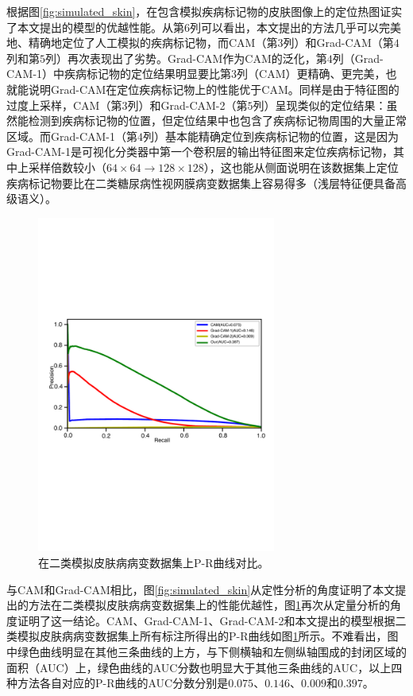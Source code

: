 根据图\ref{fig:simulated_skin}，在包含模拟疾病标记物的皮肤图像上的定位热图证实了本文提出的模型的优越性能。从第$6$列可以看出，本文提出的方法几乎可以完美地、精确地定位了人工模拟的疾病标记物，而CAM（第$3$列）和Grad-CAM（第$4$列和第$5$列）再次表现出了劣势。Grad-CAM作为CAM的泛化，第$4$列（Grad-CAM-1）中疾病标记物的定位结果明显要比第$3$列（CAM）更精确、更完美，也就能说明Grad-CAM在定位疾病标记物上的性能优于CAM。同样是由于特征图的过度上采样，CAM（第$3$列）和Grad-CAM-2（第$5$列）呈现类似的定位结果：虽然能检测到疾病标记物的位置，但定位结果中也包含了疾病标记物周围的大量正常区域。而Grad-CAM-1（第$4$列）基本能精确定位到疾病标记物的位置，这是因为Grad-CAM-1是可视化分类器中第一个卷积层的输出特征图来定位疾病标记物，其中上采样倍数较小（$64\times 64\rightarrow 128\times 128$），这也能从侧面说明在该数据集上定位疾病标记物要比在二类糖尿病性视网膜病变数据集上容易得多（浅层特征便具备高级语义）。
\begin{figure}[h]
	\centering
	\includegraphics[width=0.7\textwidth]{figure/pr_curve_skin_image/pr_curve.pdf}
	\caption[在二类模拟皮肤病病变数据集上P-R曲线对比]{在二类模拟皮肤病病变数据集上P-R曲线对比。}
	\label{fig:simulated_skin_pr_curve}
\end{figure}

与CAM和Grad-CAM相比，图\ref{fig:simulated_skin}从定性分析的角度证明了本文提出的方法在二类模拟皮肤病病变数据集上的性能优越性，图\ref{fig:simulated_skin_pr_curve}再次从定量分析的角度证明了这一结论。CAM、Grad-CAM-1、Grad-CAM-2和本文提出的模型根据二类模拟皮肤病病变数据集上所有标注所得出的P-R曲线如图\ref{fig:simulated_skin_pr_curve}所示。不难看出，图中绿色曲线明显在其他三条曲线的上方，与下侧横轴和左侧纵轴围成的封闭区域的面积（AUC）上，绿色曲线的AUC分数也明显大于其他三条曲线的AUC，以上四种方法各自对应的P-R曲线的AUC分数分别是$0.075$、$0.146$、$0.009$和$0.397$。

